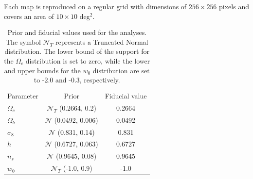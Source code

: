 \documentclass{aa}
\begin{document}
Each map is reproduced on a regular grid with dimensions of $256 \times 256$ pixels and covers an area of $10\times 10$ deg$^2$.
\begin{table}
	\begin{center}
    	\begin{tabular}{lcc} 
    		\hline \hline
    		Parameter  & Prior & Fiducial value \\
    		$\Omega_c$ & $\mathcal{N}_T$ (0.2664, 0.2) & 0.2664 \\
    		$\Omega_b$ & $\mathcal{N}$ (0.0492, 0.006) & 0.0492 \\
    		$\sigma_8$ & $\mathcal{N}$ (0.831, 0.14) & 0.831 \\
    		$h$ & $\mathcal{N}$ (0.6727, 0.063) & 0.6727\\
    		$n_s$ & $\mathcal{N}$ (0.9645, 0.08) & 0.9645 \\
    		$w_{0}$ &  $\mathcal{N}_T$ (-1.0, 0.9) &  -1.0 \\
    		\hline
    	\end{tabular}
        \caption{ Prior and fiducial values used for the analyses. 
        The symbol $\mathcal{N}_T$ represents a Truncated Normal distribution. The lower bound of the support for the $\Omega_c$ distribution is set to zero, while the lower and upper bounds for the $w_0$ distribution are set to -2.0 and -0.3, respectively.}
	    \label{tab:prior}
    \end{center}
\end{table}
\end{document}
